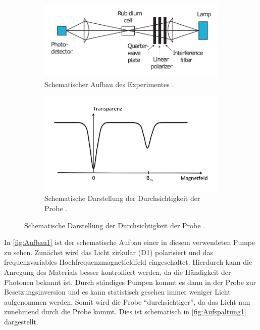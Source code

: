 \begin{figure}
    \begin{subfigure}{0.48\textwidth}
        \centering
        \includegraphics[width =\linewidth]{pictures/Aufbau1.pdf}
        \caption{Schematischer Aufbau des Experimentes \cite{optical_pumping}.}
        \label{fig:Aufbau1}
    \end{subfigure}
    \hfill
    \begin{subfigure}{0.48\textwidth}
        \centering
        \includegraphics[width =\linewidth]{pictures/Aufspaltung1.pdf}
        \caption{Schematische Darstellung der Durchsichtigkeit der Probe \cite{v21}.}
        \label{fig:Aufspaltung1}
    \end{subfigure}
\end{figure}

In \autoref{fig:Aufbau1} ist der schematische Aufbau einer in diesem verwendeten Pumpe zu sehen.
Zunächst wird das Licht zirkular (D1) polarisiert und das  frequenzvariables Hochfrequenzmagnetfeldfeld eingeschaltet.
Hierdurch kann die Anregung des Materials besser kontrolliert werden, da die Händigkeit der Photonen bekannt ist.
Durch ständiges Pumpen kommt es dann in der Probe zur Besetzungsinversion und es kann statistisch gesehen immer weniger Licht aufgenommen werden.
Somit wird die Probe \enquote{durchsichtiger}, da das Licht nun zunehmend durch die Probe kommt.
Dies ist schematisch in \autoref{fig:Aufspaltung1} dargestellt.

